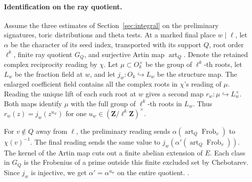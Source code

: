 \paragraph{Identification on the ray quotient.}
%
Assume the three estimates of Section~\ref{sec:integral} on the
preliminary signatures, toric distributions and theta tests. At a
marked final place \(w\mid\ell\), let \(\alpha\) be the character
of its seed index, transported with its support \(Q\), root order
\(\ell^k\), finite ray quotient \(G_Q\), and surjective Artin map
\(\operatorname{art}_Q\). Denote the retained complex reciprocity
reading by \(\chi\). Let \(\mu\subset O_k^\times\) be the group of
\(\ell^k\)-th roots, let \(L_w\) be the fraction field at \(w\), and
let \(j_w:O_k\hookrightarrow L_w\) be the structure map.
The enlarged coefficient field contains all the complex roots in
\(\chi\)'s reading of \(\mu\). Reading the unique lift of each such
root at \(w\) gives a second map \(r_w:\mu\hookrightarrow L_w^\times\).
Both maps identify \(\mu\) with the full group of \(\ell^k\)-th roots
in \(L_w\). Thus \(r_w(z)=j_w(z^{u_w})\) for one
\(u_w\in(\mathbf Z/\ell^k\mathbf Z)^\times\).

For \(v\notin Q\) away from \(\ell\), the preliminary reading sends
\(\alpha(\operatorname{art}_Q\operatorname{Frob}_v)\) to
\(\chi(v)^{-1}\). The final reading sends the same value to
\(j_w(\alpha'(\operatorname{art}_Q\operatorname{Frob}_v))\).
The kernel of the Artin map cuts out a finite abelian extension of
\(E\). Each class in \(G_Q\) is the Frobenius of a prime outside
this finite excluded set by Chebotarev. Since \(j_w\) is injective,
we get \(\alpha'=\alpha^{u_w}\) on the entire quotient.
.


